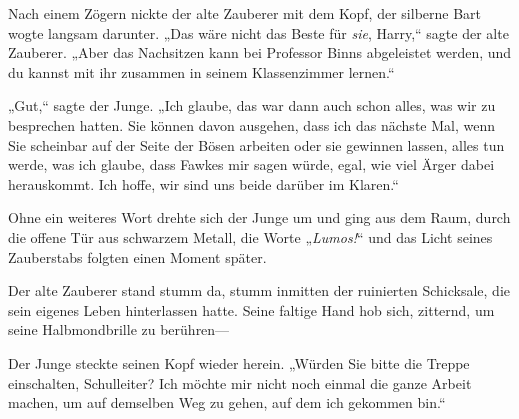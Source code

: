Nach einem Zögern nickte der alte Zauberer mit dem Kopf, der silberne Bart wogte langsam darunter. „Das wäre nicht das Beste für \emph{sie}, Harry,“ sagte der alte Zauberer. „Aber das Nachsitzen kann bei Professor Binns abgeleistet werden, und du kannst mit ihr zusammen in seinem Klassenzimmer lernen.“

„Gut,“ sagte der Junge. „Ich glaube, das war dann auch schon alles, was wir zu besprechen hatten. Sie können davon ausgehen, dass ich das nächste Mal, wenn Sie scheinbar auf der Seite der Bösen arbeiten oder sie gewinnen lassen, alles tun werde, was ich glaube, dass Fawkes mir sagen würde, egal, wie viel Ärger dabei herauskommt. Ich hoffe, wir sind uns beide darüber im Klaren.“

Ohne ein weiteres Wort drehte sich der Junge um und ging aus dem Raum, durch die offene Tür aus schwarzem Metall, die Worte „\emph{Lumos!}“ und das Licht seines Zauberstabs folgten einen Moment später.

Der alte Zauberer stand stumm da, stumm inmitten der ruinierten Schicksale, die sein eigenes Leben hinterlassen hatte. Seine faltige Hand hob sich, zitternd, um seine Halbmondbrille zu berühren—

Der Junge steckte seinen Kopf wieder herein. „Würden Sie bitte die Treppe einschalten, Schulleiter? Ich möchte mir nicht noch einmal die ganze Arbeit machen, um auf demselben Weg zu gehen, auf dem ich gekommen bin.“

